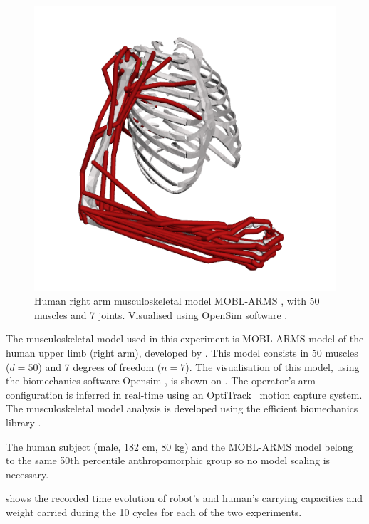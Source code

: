 \begin{figure}
\vspace{-0.5cm}
    \centering
    \includegraphics[width=\linewidth]{Papers/images/model_50m7dof.png}
    \caption{Human right arm musculoskeletal model MOBL-ARMS \cite{saul2015benchmarking}, with 50 muscles and 7 joints. Visualised using OpenSim software \cite{opensim}.  }
    \label{fig:model_musc}
\end{figure}
The musculoskeletal model used in this experiment is MOBL-ARMS model \cite{saul2015benchmarking} of the human upper limb (right arm), developed by \citet{holzbaur2005model}. This model consists in 50 muscles ($d=50$) and 7 degrees of freedom ($n=7$). The visualisation of this model, using the biomechanics software Opensim \cite{opensim}, is shown on .
The operator's arm configuration is inferred in real-time using an OptiTrack~\cite{optitrack} motion capture system. The musculoskeletal model analysis is developed using the efficient biomechanics library  \cite{Michaud2021}. 

The human subject (male, 182 cm, 80 kg) and the MOBL-ARMS model belong to the same 50th percentile anthropomorphic group \cite{gordon1989anthropometric} so no model scaling \cite{correa20112782} is necessary.

 shows the recorded time evolution of robot's and human's carrying capacities and weight carried during the 10 cycles for each of the two experiments. 

